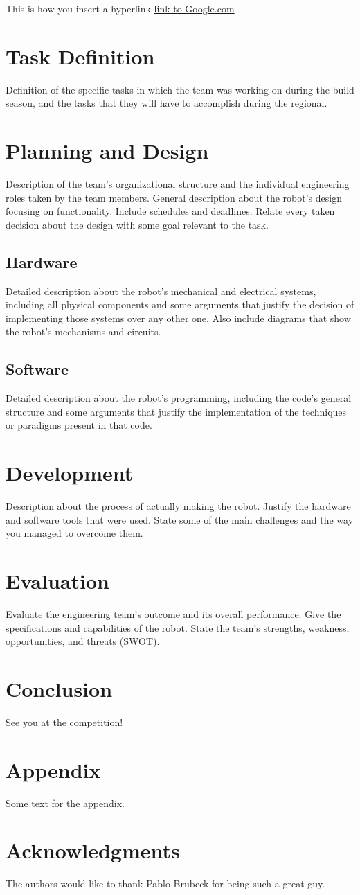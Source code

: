 \documentclass[%
 reprint, %
 amsmath,amssymb,
 aps,
 pra,
]{revtex4-1}
\begin{document}
This is how you insert a hyperlink \href{http://google.com}{link to Google.com}


\section{Task Definition}
Definition of the specific tasks in which the team was working on during the build season, and the tasks that they will have to accomplish during the regional.

\section{Planning and Design}
Description of the team's organizational structure and the individual engineering roles taken by the team members. General description about the robot's design focusing on functionality. Include schedules and deadlines. Relate every taken decision about the design with some goal relevant to the task.

\subsection{Hardware}
Detailed description about the robot's mechanical and electrical systems, including all physical components and some arguments that justify the decision of implementing those systems over any other one. Also include diagrams that show the robot's mechanisms and circuits.

\subsection{Software}
Detailed description about the robot's programming, including the code's general structure and some arguments that justify the implementation of the techniques or paradigms present in that code. 


\section{Development}
Description about the process of actually making the robot. Justify the hardware and software tools that were used. State some of the main challenges and the way you managed to overcome them.


\section{Evaluation}
Evaluate the engineering team's outcome and its overall performance. Give the specifications and capabilities of the robot. State the team's strengths, weakness, opportunities, and threats (SWOT).

\section{Conclusion}
See you at the competition!

\section{Appendix}
Some text for the appendix.

\section*{Acknowledgments}
The authors would like to thank Pablo Brubeck for being such a great guy.



\end{document}
